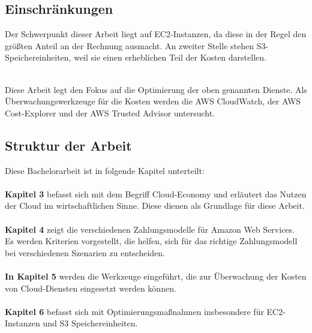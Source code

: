 \subsection{Einschränkungen}
Der Schwerpunkt dieser Arbeit liegt auf EC2-Instanzen, da diese in der Regel den größten Anteil an der Rechnung ausmacht.
An zweiter Stelle stehen S3-Speichereinheiten, weil sie einen erheblichen Teil der Kosten darstellen.

{\cite{AMZ08,AMZ09}} 
\\
Diese Arbeit legt den Fokus auf die Optimierung der oben genannten Dienste.
Als Überwachungswerkzeuge für die Kosten werden die AWS CloudWatch, der AWS Cost-Explorer und der AWS Trusted Advisor untersucht. 

\subsection{Struktur der Arbeit}

Diese Bachelorarbeit ist in folgende Kapitel unterteilt:\\\\
\textbf{Kapitel 3} 
befasst sich mit dem Begriff Cloud-Economy und erläutert das Nutzen der Cloud im wirtschaftlichen Sinne. Diese dienen als Grundlage für diese Arbeit. \\\\
\textbf{Kapitel 4} 
zeigt die verschiedenen Zahlungsmodelle für Amazon Web Services. 
\\
Es werden Kriterien vorgestellt, die helfen, sich für das richtige Zahlungsmodell bei verschiedenen Szenarien zu entscheiden. 
\\\\
\textbf{In Kapitel 5} werden die Werkzeuge eingeführt, die zur Überwachung der Kosten von Cloud-Diensten eingesetzt werden können.
\\\\
\textbf{Kapitel 6} befasst sich mit Optimierungsmaßnahmen insbesondere für EC2-Instanzen und S3 Speichereinheiten.

 
